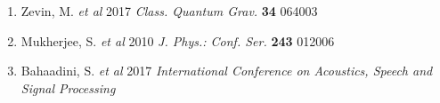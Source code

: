 \documentclass[a4paper]{article}
\begin{document}
\begin{enumerate}
	\item Zevin, M. \textit{et al} 2017 \textit{Class. Quantum Grav.} \textbf{34} 064003%
	\item Mukherjee, S. \textit{et al} 2010 \textit{J. Phys.: Conf. Ser.} \textbf{243} 012006 %
	\item Bahaadini, S. \textit{et al} 2017 \textit{International Conference on Acoustics, Speech and Signal Processing}%
\end{enumerate}
\end{document}
